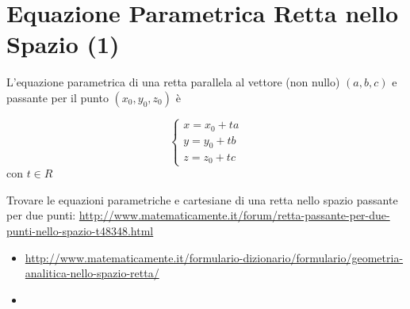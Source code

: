 \section{Equazione Parametrica Retta nello Spazio (1)}
\begin{definizione}
L'equazione parametrica di una retta parallela al vettore (non nullo) $(a,b,c)$ e passante per il punto $(x_0,y_0,z_0)$ è

 \begin{equation}
   \begin{cases}
   x=x_0 + ta \\
   y=y_0 + tb \\
   z=z_0 + tc
   \end{cases}
\end{equation}
con $t \in R$

\end{definizione}

\begin{osservazione}
Trovare le equazioni parametriche e cartesiane di una retta nello spazio passante per due punti: 
\url{http://www.matematicamente.it/forum/retta-passante-per-due-punti-nello-spazio-t48348.html}
\end{osservazione}




\begin{osservazione}
\begin{itemize}
 \item \url{http://www.matematicamente.it/formulario-dizionario/formulario/geometria-analitica-nello-spazio-retta/}
 \item \url{}
\end{itemize}
\end{osservazione}

